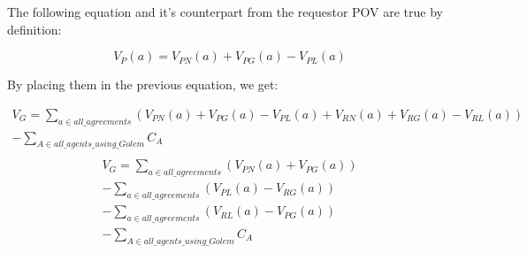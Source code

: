 \documentclass{article}
\begin{document}
The following equation and it's counterpart from the requestor POV are true by definition:

\begin{equation}
    V_P(a) = V_{PN}(a) + V_{PG}(a) - V_{PL}(a)
\end{equation}

By placing them in the previous equation, we get:

\begin{equation}
\begin{split}
    V_G = \sum_{a \in all\_agreements}(V_{PN}(a) + V_{PG}(a) - V_{PL}(a) + V_{RN}(a) + V_{RG}(a) - V_{RL}(a)) \\
            - \sum_{A \in all\_agents\_using\_Golem}C_A \\
\end{split}
\end{equation}
\begin{equation}
\begin{split}
    V_G = \sum_{a \in all\_agreements}(V_{PN}(a) + V_{PG}(a)) \\
          - \sum_{a \in all\_agreements}(V_{PL}(a)- V_{RG}(a)) \\
          - \sum_{a \in all\_agreements}(V_{RL}(a)- V_{PG}(a)) \\
          - \sum_{A \in all\_agents\_using\_Golem}C_A
\end{split}
\end{equation}
\end{document}
